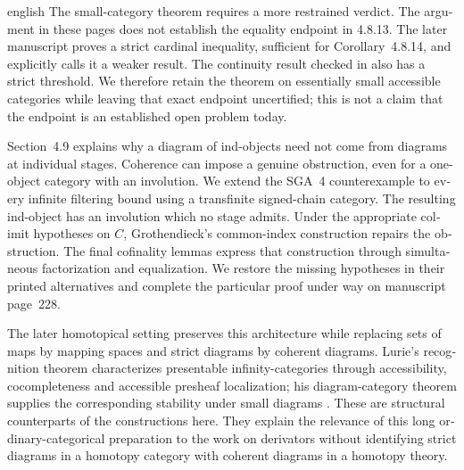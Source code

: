 \begin{otherlanguage}{english}
\begin{otherlanguage*}{english}
The small-category theorem requires a more restrained verdict. The argument in these pages does not establish the equality endpoint in 4.8.13. The later manuscript proves a strict cardinal inequality, sufficient for Corollary~4.8.14, and explicitly calls it a weaker result. The continuity result checked in \citet{Tendas2022Continuity} also has a strict threshold. We therefore retain the theorem on essentially small accessible categories while leaving that exact endpoint uncertified; this is not a claim that the endpoint is an established open problem today.

Section~4.9 explains why a diagram of ind-objects need not come from diagrams at individual stages. Coherence can impose a genuine obstruction, even for a one-object category with an involution. We extend the SGA~4 counterexample to every infinite filtering bound using a transfinite signed-chain category. The resulting ind-object has an involution which no stage admits. Under the appropriate colimit hypotheses on $C$, Grothendieck's common-index construction repairs the obstruction. The final cofinality lemmas express that construction through simultaneous factorization and equalization. We restore the missing hypotheses in their printed alternatives and complete the particular proof under way on manuscript page~228.

The later homotopical setting preserves this architecture while replacing sets of maps by mapping spaces and strict diagrams by coherent diagrams. Lurie's recognition theorem characterizes presentable infinity-categories through accessibility, cocompleteness and accessible presheaf localization; his diagram-category theorem supplies the corresponding stability under small diagrams \citep[Theorem~5.5.1.1 and Proposition~5.4.4.3]{Lurie2009HTT}. These are structural counterparts of the constructions here. They explain the relevance of this long ordinary-categorical preparation to the work on derivators without identifying strict diagrams in a homotopy category with coherent diagrams in a homotopy theory.
\end{otherlanguage*}
\end{otherlanguage}
\dgrchunkend
